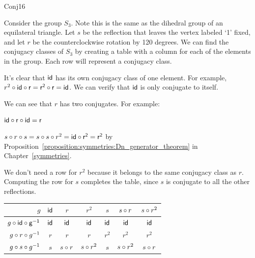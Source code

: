 \begin {example}{Conj16}

Consider the group $S_3$.  Note this is the same as the dihedral group of an equilateral triangle.  
Let $s$ be the reflection that leaves the vertex labeled `1' fixed, and let $r$ be the counterclockwise rotation by 120 degrees.  We can find the conjugacy classes of $S_3$ by creating a table with a column for each of the elements in the group.  Each row will represent a conjugacy class.  

It's clear that $\sf{id}$ has its own conjugacy class of one element.  For example, 
$r^2\circ \sf{id} \circ r=r^2\circ r=\sf{id}$. We can verify that $\sf{id}$ is only conjugate to itself.

 We can see that $r$ has two conjugates.  For example:

 $\sf{id}\circ r \circ \sf{id}=r$ 

$s\circ r \circ s=s\circ s\circ r^2=\sf{id}\circ r^2=r^2$
by Proposition~\ref{proposition:symmetries:Dn_generator_theorem}  in Chapter~\ref{symmetries}.  

%


We don't need a row for $r^2$ because it belongs to the same conjugacy class as $r$.  
Computing the row for $s$ completes the table, since $s$ is conjugate to all the other reflections.

\begin{center}
\begin{tabular}{|r | c | c |c | c | c |c |}\hline
$g$ &$\sf{id}$ & $r$ &$r^2$ &$ s$ &$ s\circ r$ & $s\circ r ^2$\\ \hline
$g\circ \sf{id}\circ g^{-1}$ & $\sf{id}$ & $\sf{id}$ & $\sf{id}$ &$\sf{id}$ &$\sf{id}$ &$\sf{id}$ \\ \hline
$ g\circ r\circ g^{-1}$& $r$&$ r$& $r$&$r^2$ &$r^2$ & $r^2$\\ \hline
$g\circ s\circ g^{-1}$ & $s$ &$ s\circ r$ & $s\circ r^2$ & $s$ & $s\circ r^2$ & $s\circ r$\\ \hline 
\end{tabular}
\end{center}


\end{example}
